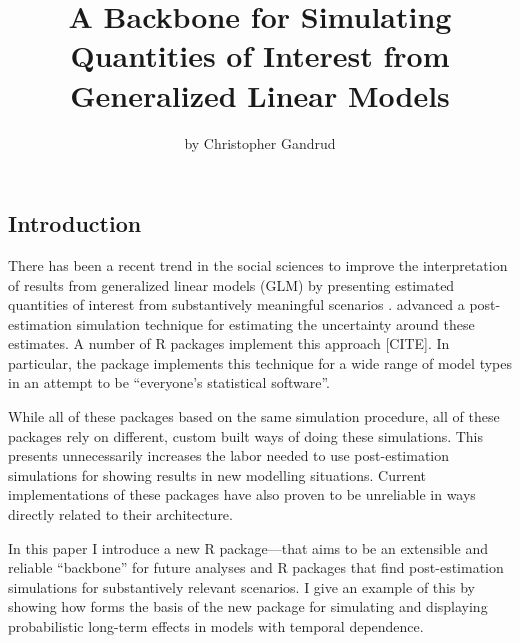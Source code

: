 \title{A Backbone for Simulating Quantities of Interest from Generalized Linear
Models}
\author{by Christopher Gandrud}

\maketitle


\subsection{Introduction}\label{introduction}

There has been a recent trend in the social sciences to improve the
interpretation of results from generalized linear models (GLM) by
presenting estimated quantities of interest from substantively
meaningful scenarios
\citep[e.g.][]{gandrud2005,Licht2011,WilliamsWhitten2012}.
\citet{King2000} advanced a post-estimation simulation technique for
estimating the uncertainty around these estimates. A number of R
packages implement this approach {[}CITE{]}. In particular, the
 package \citep{R-Zelig} implements this technique for a
wide range of model types in an attempt to be ``everyone's statistical
software''.

While all of these packages based on the same simulation procedure, all
of these packages rely on different, custom built ways of doing these
simulations. This presents unnecessarily increases the labor needed to
use post-estimation simulations for showing results in new modelling
situations. Current implementations of these packages have also proven
to be unreliable in ways directly related to their architecture.

In this paper I introduce a new R package----that aims
to be an extensible and reliable ``backbone'' for future analyses and R
packages that find post-estimation simulations for substantively
relevant scenarios. I give an example of this by showing how
 forms the basis of the new  package for
simulating and displaying probabilistic long-term effects in models with
temporal dependence.


